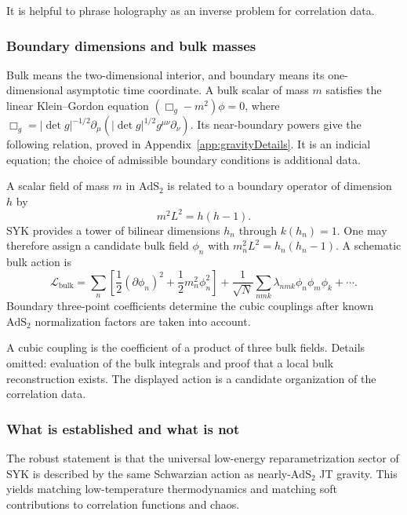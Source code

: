 \documentclass[11pt]{article}
\numberwithin{equation}{section}
\theoremstyle{exposition}
\theoremstyle{result}
\newcommand{\AdS}{\mathrm{AdS}}
\begin{document}
It is helpful to phrase holography as an inverse problem for correlation data.

\subsubsection{Boundary dimensions and bulk masses}


Bulk means the two-dimensional interior, and boundary means its one-dimensional asymptotic time coordinate. A bulk scalar of mass $m$ satisfies the linear Klein--Gordon equation $(\Box_g-m^2)\phi=0$, where $\Box_g=|\det g|^{-1/2}\partial_\mu(|\det g|^{1/2}g^{\mu\nu}\partial_\nu)$. Its near-boundary powers give the following relation, proved in Appendix~\ref{app:gravityDetails}. It is an indicial equation; the choice of admissible boundary conditions is additional data.

A scalar field of mass $m$ in $\AdS_2$ is related to a boundary operator of dimension $h$ by
\begin{equation}
m^2L^2=h(h-1).
\label{eq:massdimension}
\end{equation}
SYK provides a tower of bilinear dimensions $h_n$ through $k(h_n)=1$. One may therefore assign a candidate bulk field $\phi_n$ with $m_n^2L^2=h_n(h_n-1)$. A schematic bulk action is
\begin{equation*}
\mathcal L_{\mathrm{bulk}}
=\sum_n\left[
\frac12(\partial\phi_n)^2+\frac12m_n^2\phi_n^2
\right]
+\frac1{\sqrt N}\sum_{nmk}\lambda_{nmk}\phi_n\phi_m\phi_k+\cdots.
\end{equation*}
Boundary three-point coefficients determine the cubic couplings after known $\AdS_2$ normalization factors are taken into account.

A cubic coupling is the coefficient of a product of three bulk fields. Details omitted: evaluation of the bulk integrals and proof that a local bulk reconstruction exists. The displayed action is a candidate organization of the correlation data.

\subsubsection{What is established and what is not}

The robust statement is that the universal low-energy reparametrization sector of SYK is described by the same Schwarzian action as nearly-$\AdS_2$ JT gravity. This yields matching low-temperature thermodynamics and matching soft contributions to correlation functions and chaos.
\end{document}
